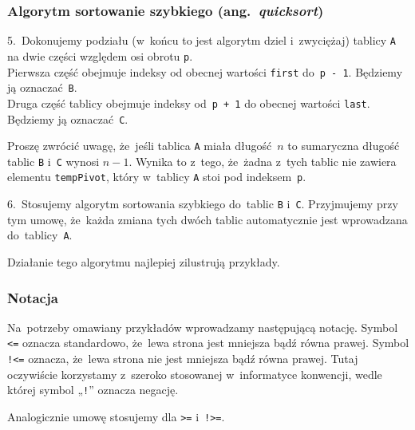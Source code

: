 \documentclass[10pt,t]{beamer}
\begin{document}
\begin{frame}
  \frametitle{Algorytm sortowanie szybkiego
    (ang.~\textit{quicksort})}


  5.~Dokonujemy podziału (w~końcu to jest algorytm dziel i~zwyciężaj)
  tablicy \texttt{A} na dwie części względem osi obrotu \texttt{p}. \\
  Pierwsza część obejmuje indeksy od obecnej wartości \texttt{first}
  do~\texttt{p - 1}. Będziemy ją oznaczać~\texttt{B}. \\
  Druga część tablicy obejmuje indeksy od~\texttt{p + 1} do obecnej
  wartości \texttt{last}. Będziemy ją oznaczać~\texttt{C}.

  Proszę zwrócić uwagę, że~jeśli tablica \texttt{A} miała długość~$n$
  to sumaryczna długość tablic \texttt{B} i~\texttt{C} wynosi $n - 1$.
  Wynika to z~tego, że~żadna z~tych tablic nie zawiera elementu
  \texttt{tempPivot}, który w~tablicy \texttt{A} stoi pod
  indeksem~\texttt{p}.

  6.~Stosujemy algorytm sortowania szybkiego do~tablic \texttt{B}
  i~\texttt{C}. Przyjmujemy przy tym umowę, że~każda zmiana tych dwóch
  tablic automatycznie jest wprowadzana do~tablicy~\texttt{A}.

  Działanie tego algorytmu najlepiej zilustrują przykłady.

\end{frame}





\begin{frame}
  \frametitle{Notacja}


  Na~potrzeby omawiany przykładów wprowadzamy następującą notację.
  Symbol \texttt{<=} oznacza standardowo, że~lewa strona jest mniejsza bądź
  równa prawej. Symbol \texttt{!<=} oznacza, że~lewa strona \alert{nie}
  jest mniejsza bądź równa prawej. Tutaj oczywiście korzystamy z~szeroko
  stosowanej w~informatyce konwencji, wedle której symbol „\texttt{!}”
  oznacza negację.

  Analogicznie umowę stosujemy dla \texttt{>=} i~\texttt{!>=}.

\end{frame}
\end{document}
